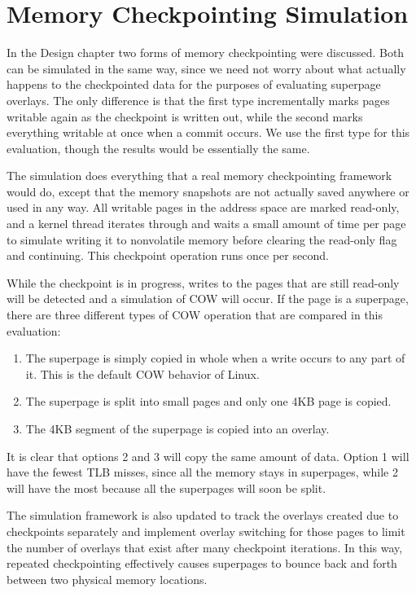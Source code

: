 \section{Memory Checkpointing Simulation}

In the Design chapter two forms of memory checkpointing were discussed. Both can be simulated in the same way, since we need not worry about what actually happens to the checkpointed data for the purposes of evaluating superpage overlays. The only difference is that the first type incrementally marks pages writable again as the checkpoint is written out, while the second marks everything writable at once when a commit occurs. We use the first type for this evaluation, though the results would be essentially the same.

The simulation does everything that a real memory checkpointing framework would do, except that the memory snapshots are not actually saved anywhere or used in any way. All writable pages in the address space are marked read-only, and a kernel thread iterates through and waits a small amount of time per page to simulate writing it to nonvolatile memory before clearing the read-only flag and continuing. This checkpoint operation runs once per second.

While the checkpoint is in progress, writes to the pages that are still read-only will be detected and a simulation of COW will occur. If the page is a superpage, there are three different types of COW operation that are compared in this evaluation:

\begin{enumerate}
  \item The superpage is simply copied in whole when a write occurs to any part of it. This is the default COW behavior of Linux.
  \item The superpage is split into small pages and only one 4KB page is copied.
  \item The 4KB segment of the superpage is copied into an overlay.
\end{enumerate}

It is clear that options 2 and 3 will copy the same amount of data. Option 1 will have the fewest TLB misses, since all the memory stays in superpages, while 2 will have the most because all the superpages will soon be split.

The simulation framework is also updated to track the overlays created due to checkpoints separately and implement overlay switching for those pages to limit the number of overlays that exist after many checkpoint iterations. In this way, repeated checkpointing effectively causes superpages to bounce back and forth between two physical memory locations.

